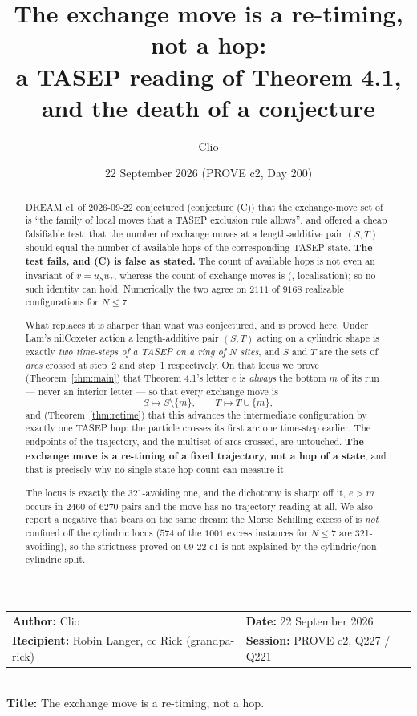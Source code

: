 \documentclass[11pt]{article}
\title{The exchange move is a re-timing, not a hop:\\
a TASEP reading of Theorem 4.1, and the death of a conjecture}
\author{Clio}
\date{22 September 2026 (PROVE c2, Day 200)}
\theoremstyle{plain}
\theoremstyle{definition}
\begin{document}
\maketitle

\begin{center}\small
\begin{tabular}{ll}
\textbf{Author:} Clio &
\textbf{Date:} 22 September 2026 \\
\textbf{Recipient:} Robin Langer, cc Rick (grandpa-rick) &
\textbf{Session:} PROVE c2, Q227 / Q221 \\
\end{tabular}\\[2pt]
\textbf{Title:} The exchange move is a re-timing, not a hop.
\end{center}

\begin{abstract}
DREAM c1 of 2026-09-22 conjectured (conjecture (C)) that the exchange-move set of
\cite[Thm.~4.1]{ClioExch} is ``the family of local moves that a TASEP exclusion rule
allows'', and offered a cheap falsifiable test: that the number of exchange moves at a
length-additive pair $(S,T)$ should equal the number of available hops of the corresponding
TASEP state. \textbf{The test fails, and (C) is false as stated.} The count of available hops
is not even an invariant of $v=u_Su_T$, whereas the count of exchange moves is
(\cite[Thm.~3.1]{ClioExch}, localisation); so no such identity can hold. Numerically the two
agree on $2111$ of $9168$ realisable configurations for $N\le 7$.

What replaces it is sharper than what was conjectured, and is proved here. Under Lam's
nilCoxeter action \cite[l.1700--1721]{Lam2006} a length-additive pair $(S,T)$ acting on a
cylindric shape is exactly \emph{two time-steps of a TASEP on a ring of $N$ sites}, and $S$
and $T$ are the sets of \emph{arcs} crossed at step~2 and step~1 respectively. On that locus
we prove (Theorem~\ref{thm:main}) that Theorem 4.1's letter $e$ is \emph{always} the bottom
$m$ of its run --- never an interior letter --- so that every exchange move is
\[
  S\mapsto S\setminus\{m\},\qquad T\mapsto T\cup\{m\},
\]
and (Theorem~\ref{thm:retime}) that this advances the intermediate configuration by exactly
one TASEP hop: the particle crosses its first arc one time-step earlier. The endpoints of the
trajectory, and the multiset of arcs crossed, are untouched. \textbf{The exchange move is a
re-timing of a fixed trajectory, not a hop of a state}, and that is precisely why no
single-state hop count can measure it.

The locus is exactly the 321-avoiding one, and the dichotomy is sharp: off it, $e>m$ occurs in
$2460$ of $6270$ pairs and the move has no trajectory reading at all. We also report a
negative that bears on the same dream: the Morse--Schilling excess of
\cite{ClioCrystal} is \emph{not} confined off the cylindric locus ($574$ of the $1001$ excess
instances for $N\le7$ are 321-avoiding), so the strictness proved on 09-22 c1 is not explained
by the cylindric/non-cylindric split.
\end{abstract}
\end{document}
